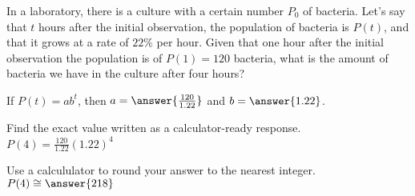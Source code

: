 \documentclass{ximera}
\author{Ivo Terek}
\begin{document}
\begin{exercise}

In a laboratory, there is a culture with a certain number $P_0$ of bacteria. Let's say that $t$ hours after the initial observation, the population of bacteria is $P(t)$, and that it grows at a rate of $22\%$ per hour. Given that one hour after the initial observation the population is of $P(1) = 120$ bacteria, what is the amount of bacteria we have in the culture after four hours? 

If $P(t)=ab^t$, then $a=\answer{\frac{120}{1.22}}$ and $b=\answer{1.22}$. 

Find the exact value written as a calculator-ready response.  $P(4)=\frac{120}{1.22}(1.22)^4$

Use a calcululator to round your answer to the nearest integer. $P(4)\cong \answer{218}$ \calcHW

\end{exercise}
\end{document}
